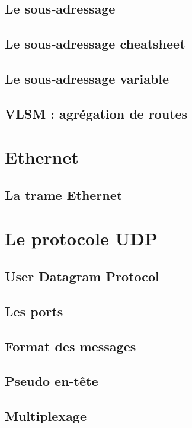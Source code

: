 \documentclass[12pt]{article}
\begin{document}
\subsection{Le sous‐adressage}

\subsection{Le sous‐adressage cheatsheet}

\subsection{Le sous‐adressage variable}

\subsection{VLSM : agrégation de routes}

\section{Ethernet}

\subsection{La trame Ethernet}

\section{Le protocole UDP}

\subsection{User Datagram Protocol}

\subsection{Les ports}

\subsection{Format des messages}

\subsection{Pseudo en-tête}

\subsection{Multiplexage}
\end{document}
